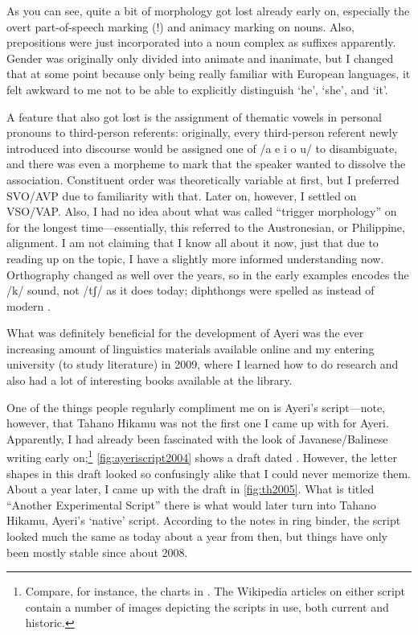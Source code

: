 As you can see, quite a bit of morphology got lost already early on, especially
the overt part-of-speech marking (!) and animacy marking on nouns. Also,
prepositions were just incorporated into a noun complex as suffixes apparently.
Gender was originally only divided into animate and inanimate, but I changed
that at some point because only being really familiar with European languages,
it felt awkward to me not to be able to explicitly distinguish `he', `she', and
`it'.

A feature that also got lost is the assignment of thematic vowels in personal
pronouns to third-person referents: originally, every third-person referent
newly introduced into discourse would be assigned one of /a e i o u/ to
disambiguate, and there was even a morpheme to mark that the speaker wanted to
dissolve the association. Constituent order was theoretically variable at
first, but I preferred SVO/AVP due to familiarity with that. Later on, however,
I settled on VSO/VAP. Also, I had no idea about what was called ``trigger
morphology'' on  for the longest time---essentially, this
referred to the Austronesian, or Philippine, alignment. I am not claiming that
I know all about it now, just that due to reading up on the topic, I have a
slightly more informed understanding now. Orthography changed as well over the
years, so  in the early examples encodes the /k/ sound, not /tʃ/ as it
does today; diphthongs were spelled as  instead of modern .

What was definitely beneficial for the development of Ayeri was the ever 
increasing amount of linguistics materials available online and my entering 
university (to study literature) in 2009, where I learned how to do research 
and also had a lot of interesting books available at the library.

One of the things people regularly compliment me on is Ayeri's script---note,
however, that Tahano Hikamu was not the first one I came
up with for Ayeri. Apparently, I had already been fascinated with the look of
Javanese/Balinese writing early on;\footnote{Compare, for instance, the charts
in \citet{kuipersmcdermott1996}. The Wikipedia articles on either script
contain a number of images depicting the scripts in use, both current and
historic.} \autoref{fig:ayeriscript2004} shows a draft dated
. However, the letter shapes in this draft looked so
confusingly alike that I could never memorize them. About a year later, I came
up with the draft in \autoref{fig:th2005}. What is titled ``Another
Experimental Script'' there is what would later turn into Tahano Hikamu,
Ayeri's `native' script. According to the notes in ring binder, the script
looked much the same as today about a year from then, but things have only been
mostly stable since about 2008.

